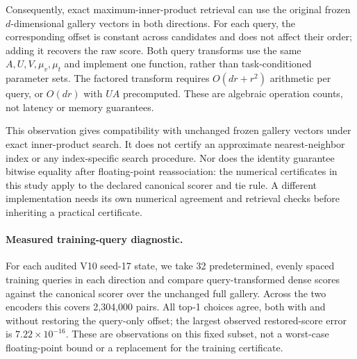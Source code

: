 \documentclass[11pt]{article}
\begin{document}
Consequently, exact maximum-inner-product retrieval can use the original
frozen $d$-dimensional gallery vectors in both directions. For each query,
the corresponding offset is constant across candidates and does not affect
their order; adding it recovers the raw score. Both query transforms use
the same $A,U,V,\mu_v,\mu_t$ and implement one function, rather than
task-conditioned parameter sets. The factored transform requires
$O(dr+r^2)$ arithmetic per query, or $O(dr)$ with $UA$ precomputed.
These are algebraic operation counts, not latency or memory guarantees.

This observation gives compatibility with unchanged frozen gallery vectors
under exact inner-product search. It does not certify an approximate
nearest-neighbor index or any index-specific search procedure. Nor does
the identity guarantee bitwise equality after floating-point reassociation:
the numerical certificates in this study apply to the declared canonical
scorer and tie rule. A different implementation needs its own numerical
agreement and retrieval checks before inheriting a practical certificate.

\paragraph{Measured training-query diagnostic.}
For each audited V10 seed-17 state, we take 32 predetermined, evenly spaced
training queries in each direction and compare query-transformed dense
scores against the canonical scorer over the unchanged full gallery.
Across the two encoders this covers 2,304,000 pairs. All top-1 choices
agree, both with and without restoring the query-only offset; the largest
observed restored-score error is $7.22\times10^{-16}$. These are observations
on this fixed subset, not a worst-case floating-point bound or a replacement
for the training certificate.
\end{document}
